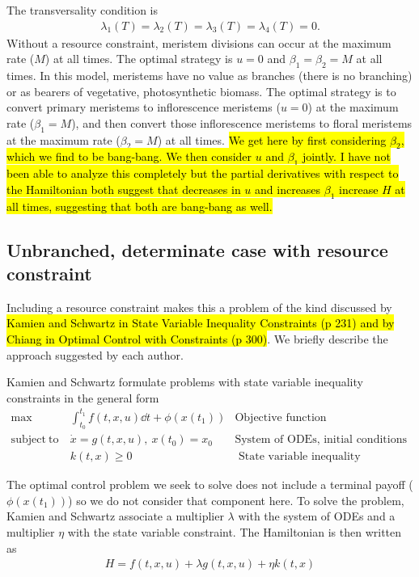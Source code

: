 \documentclass[12pt, oneside]{article}   	%
\begin{document}
The transversality condition is
%
\begin{align}
\lambda_1(T) = \lambda_2(T) = \lambda_3(T) = \lambda_4(T) = 0.
\end{align}
%
Without a resource constraint, meristem divisions can occur at the maximum rate ($M$) at all times. The optimal strategy is $u=0$ and $\beta_1=\beta_2=M$ at all times. In this model, meristems have no value as branches (there is no branching) or as bearers of vegetative, photosynthetic biomass. The optimal strategy is to convert primary meristems to inflorescence meristems ($u=0$) at the maximum rate ($\beta_1=M$), and then convert those inflorescence meristems to floral meristems at the maximum rate ($\beta_2=M$) at all times. \hl{We get here by first considering $\beta_2$, which we find to be bang-bang. We then consider $u$ and $\beta_1$ jointly. I have not been able to analyze this completely but the partial derivatives with respect to the Hamiltonian both suggest that decreases in $u$ and increases $\beta_1$ increase $H$ at all times, suggesting that both are bang-bang as well.}

\subsection*{Unbranched, determinate case with resource constraint}

Including a resource constraint makes this a problem of the kind discussed by \hl{Kamien and Schwartz in State Variable Inequality Constraints (p 231) and by Chiang in Optimal Control with Constraints (p 300)}. We briefly describe the approach suggested by each author. 

Kamien and Schwartz formulate problems with state variable inequality constraints in the general form
%
\begin{align}
\max &  \int_{t_0}^{t_1}  f(t,x,u) \dd t + \phi(x(t_1)) & \mbox{Objective function}  \nonumber \\
\mathrm{subject\ to\ } 
& \dot{x} = g(t,x,u), \ x(t_0) = x_0 \nonumber & \mbox{System of ODEs, initial conditions}  \nonumber \\
& k(t,x) \geq 0 & \mbox{ State variable inequality constraint}  \nonumber
\end{align}

The optimal control problem we seek to solve does not include a terminal payoff ($\phi(x(t_1))$) so we do not consider that component here. To solve the problem, Kamien and Schwartz associate a multiplier $\lambda$ with the system of ODEs and a multiplier $\eta$ with the state variable constraint. The Hamiltonian is then written as
%
\begin{align}
H = f(t,x,u) + \lambda g(t,x,u) + \eta k(t,x) \nonumber
\end{align}
\end{document}
